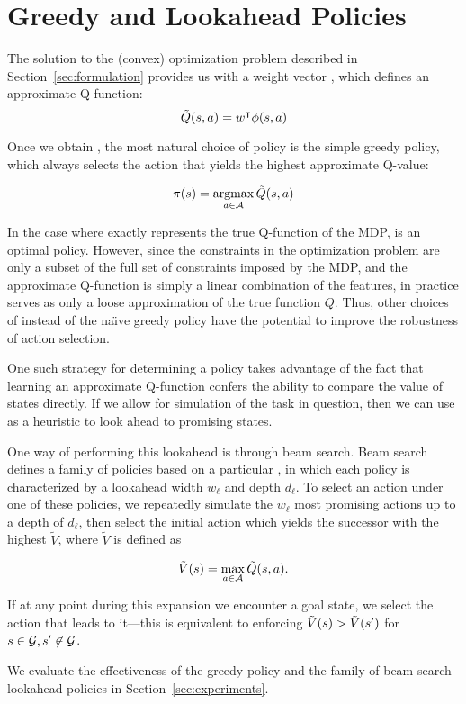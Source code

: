 \section{Greedy and Lookahead Policies}

The solution to the (convex) optimization problem described in 
Section~\ref{sec:formulation} provides us with a weight vector \weights{}, which defines 
an approximate Q-function:
\begin{equation}
  \tilde{Q}(s,a) = w^\intercal \phi({s}, {a})
\end{equation}

Once we obtain \approxq{}, the most natural choice of policy is the
simple greedy policy, which always selects the action that yields the highest
approximate Q-value:

\begin{equation}
  \pi(s) = \operatorname*{argmax}_{a \in \mathcal{A}} \tilde{Q}(s,a)
\end{equation}

In the case where \approxq{} exactly represents the true Q-function of the MDP,
\policyvar{} is an optimal policy. However, since the constraints in the optimization
problem are only a subset of the full set of constraints imposed by the MDP, and
the approximate Q-function is simply a linear combination of the features, in
practice \approxq{} serves as only a loose approximation of the true function
$Q$. Thus, other choices of \policyvar{} instead of the na\"{\i}ve greedy
policy have the potential to improve the robustness of action selection.

One such strategy for determining a policy takes advantage of the fact that
learning an approximate Q-function confers the ability to compare the value of
states directly. If we allow for simulation of the task in question, then we can
use \approxq{} as a heuristic to look ahead to promising states.

One way of performing this lookahead is through beam search. Beam search defines
a family of policies based on a particular \approxq{}, in which each policy is
characterized by a lookahead width $w_\ell$ and depth $d_\ell$. To select an action under
one of these policies, we repeatedly simulate the $w_\ell$ most promising actions up
to a depth of $d_\ell$, then select the initial action which yields the successor
with the highest $\tilde{V}$, where $\tilde{V}$ is defined as

\begin{equation}
  \tilde{V}(s) = \max_{a \in \mathcal{A}} \tilde{Q}(s, a).
\end{equation}


If at any point during this expansion we encounter a goal state, we select the
action that leads to it---this is equivalent to enforcing
$\tilde{V}(s{}) > \tilde{V}(s{}')$ for $s{} \in
\mathcal{G}{}, s{}' \not\in \mathcal{G}{}$.

We evaluate the effectiveness of the greedy policy and the family of beam search
lookahead policies in Section~\ref{sec:experiments}.
